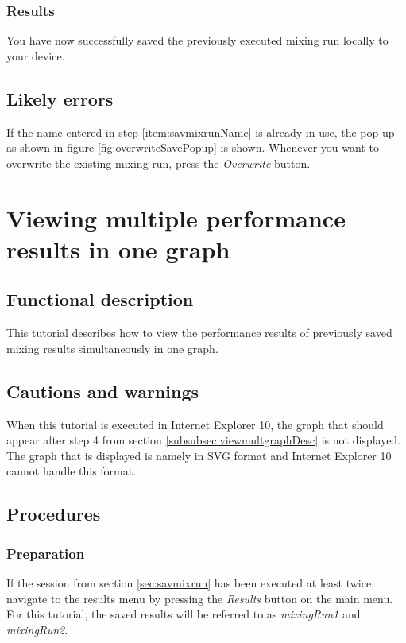 \subsubsection{Results}
You have now successfully saved the previously executed mixing run locally to your device.

\subsection{Likely errors}
If the name entered in step \ref{item:savmixrunName} is already in use, the pop-up as shown in figure \ref{fig:overwriteSavePopup} is shown. Whenever you want to overwrite the existing mixing run, press the \emph{Overwrite} button.


\section{Viewing multiple performance results in one graph}\label{sec:viewmultgraph}

\subsection{Functional description}
This tutorial describes how to view the performance results of previously saved mixing results simultaneously in one graph.

\subsection{Cautions and warnings}
When this tutorial is executed in Internet Explorer 10, the graph that should appear after step 4 from section \ref{subsubsec:viewmultgraphDesc} is not displayed. The graph that is displayed is namely in SVG format and Internet Explorer 10 cannot handle this format.

\subsection{Procedures}

\subsubsection{Preparation}
If the session from section \ref{sec:savmixrun} has been executed at least twice, navigate to the results menu by pressing the \emph{Results} button on the main menu.
For this tutorial, the saved results will be referred to as \emph{mixingRun1} and \emph{mixingRun2}.

